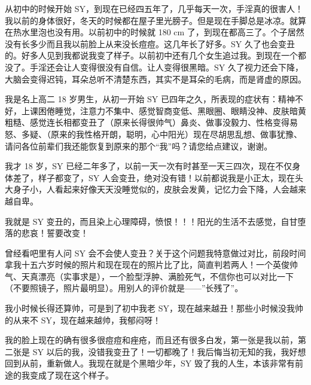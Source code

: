 \begin{case}[SY 变丑]
    从初中的时候开始 SY，到现在已经四五年了，几乎每天一次，手淫真的很害人！我以前的身体很好，冬天的时候都在屋子里光膀子。但是现在手脚总是冰凉。就算在热水里泡也没有用。以前初中的时候就 180 \unit{\cm} 了，到现在都高三了。个子居然没有长多少而且我以前脸上从来没长痘痘。这几年长了好多。SY 久了也会变丑的。好多人见到我都说我变了样子。以前初中还有几个女生追过我。到现在一个都没了。手淫还会让人变得很没有自信。让人变得很黑暗。SY 久了视力还会下降，大脑会变得迟钝，耳朵总听不清楚东西，其实不是耳朵的毛病，而是肾虚的原因。
\end{case}

\begin{case}[SY 变丑]
    我是名上高二 18 岁男生，从初一开始 SY 已四年之久，所表现的症状有：精神不好，上课困倦睡觉，注意力不集中、感觉智商变低、黑眼圈、眼睛没神、皮肤暗黄粗糙、感觉连长相都变丑了（原来长得很帅气）鼻炎、做事没毅力、性格变得易怒、多疑、（原来的我性格开朗，聪明，心中阳光）现在尽胡思乱想、做事犹豫、请问各位前辈们我还能恢复到原来的那个“我”吗？请您给点建议，谢谢。
\end{case}

\begin{case}[SY 变丑]
    我才 18 岁，SY 已经二年多了，以前一天一次有时甚至一天三四次，现在不仅身体差了，样子都变了，SY 人会变丑，绝对没有错！以前都说我是小正太，现在头大身子小，人看起来好像天天没睡觉似的，皮肤会发黄，记忆力会下降，人会越来越自卑。
\end{case}

\begin{case}[SY 变丑]
    我就是 SY 变丑的，而且染上心理障碍，愤恨！！！阳光的生活不去感觉，自甘堕落的悲哀！誓要改变！
\end{case}

\begin{case}[SY 变丑]
    曾经看吧里有人问 SY 会不会使人变丑？关于这个问题我特意做过对比，前段时间拿我十五六岁时候的照片和现在现在的照片比了比，简直判若两人！一个英俊帅气、天真漂亮（实事求是），一个脸型浮肿、满脸死气，不信你也可以对比一下（不要照镜子，照片最明显）。用别人的评价就是——”长残了”。
\end{case}

\begin{case}[SY 变丑]
    我小时候长得还算帅，可是到了初中我老 SY，现在越来越丑！那些小时候没我帅的从来不 SY，现在越来越帅，我郁闷呀！
\end{case}

\begin{case}[SY 变丑]
    我的脸上现在的确有很多很痘痘和痤疮，而且还有很多白发，第一张是我以前，第二张是 SY 以后的我，没错我变丑了！一切都晚了！我后悔当初无知的我，我好想回到从前，重新做人。我现在就是个黑暗少年，SY 毁了我的人生，本该非常有前途的我变成了现在这个样子。
\end{case}

